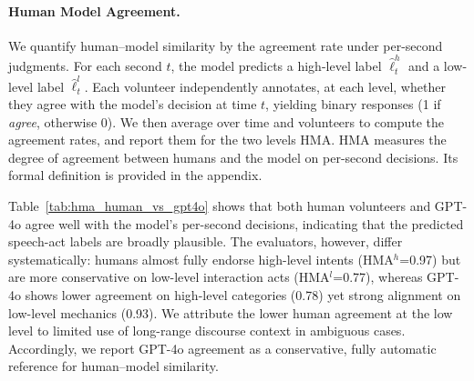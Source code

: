 \paragraph{Human Model Agreement.}
We quantify human--model similarity by the agreement rate under per-second judgments. For each second $t$, the model predicts a high-level label $\hat{\ell}^{h}_{t}$ and a low-level label $\hat{\ell}^{l}_{t}$. Each volunteer independently annotates, at each level, whether they agree with the model's decision at time $t$, yielding binary responses (1 if \emph{agree}, otherwise 0). We then average over time and volunteers to compute the agreement rates, and report them for the two levels HMA. HMA measures the degree of agreement between humans and the model on per-second decisions. Its formal definition is provided in the appendix.
\begin{table}[t]
\centering
\caption{Human--Model Agreement (HMA) for high- and low-level speech-act decisions, evaluated via per-second agree/disagree judgments. We report the mean and standard deviation over evaluated samples.}
\label{tab:hma_human_vs_gpt4o}
{\fontsize{7}{7.5}\selectfont
\setlength{\tabcolsep}{6pt}
\renewcommand{\arraystretch}{1.05}
}
\end{table}
Table~\ref{tab:hma_human_vs_gpt4o} shows that both human volunteers and GPT-4o agree well with the model’s per-second decisions, indicating that the predicted speech-act labels are broadly plausible. The evaluators, however, differ systematically: humans almost fully endorse high-level intents (HMA$^{h}$=0.97) but are more conservative on low-level interaction acts (HMA$^{l}$=0.77), whereas GPT-4o shows lower agreement on high-level categories (0.78) yet strong alignment on low-level mechanics (0.93). We attribute the lower human agreement at the low level to limited use of long-range discourse context in ambiguous cases. Accordingly, we report GPT-4o agreement as a conservative, fully automatic reference for human–model similarity.

